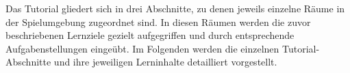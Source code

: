 Das Tutorial gliedert sich in drei Abschnitte, zu denen jeweils einzelne Räume in der Spielumgebung zugeordnet sind. In diesen Räumen werden die zuvor beschriebenen Lernziele gezielt aufgegriffen und durch entsprechende Aufgabenstellungen eingeübt. Im Folgenden werden die einzelnen Tutorial-Abschnitte und ihre jeweiligen Lerninhalte detailliert vorgestellt.




